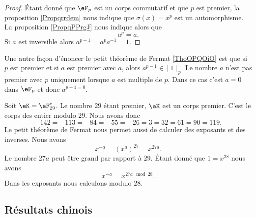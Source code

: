 \begin{proof}
    Étant donné que \( \eF_p\) est un corps commutatif et que \( p\) est premier, la proposition \ref{Propqrrdem} nous indique que \( \sigma(x)=x^p\) est un automorphisme. La proposition \ref{PropqPPrgJ} nous indique alors que
    \begin{equation}
        a^p=a.
    \end{equation}
    Si \( a\) est inversible alors \( a^{p-1}=a^pa^{-1}=1\).
\end{proof}

\begin{remark}      \label{RemCoSnxh}
    Une autre façon d'énoncer le petit théorème de Fermat \ref{ThoOPQOiO} est que si \( p\) est premier et si \( a\) est premier avec \( a\), alors \( a^{p-1}\in[1]_p\). Le nombre \( a\) n'est pas premier avec \( p\) uniquement lorsque \( a\) est multiple de \( p\). Dans ce cas c'est \( a=0\) dans \( \eF_p\) et donc \( a^{p-1=0}\).
\end{remark}

\begin{example}
    Soit \( \eK=\eF_{29}^*\). Le nombre \( 29\) étant premier, \( \eK\) est un corps premier. C'est le corps des entier modulo \( 29\). Nous avons donc
    \begin{equation}
            -142=-113=-84=-55=-26=3=32=61=90=119.
    \end{equation}
    Le petit théorème de Fermat nous permet aussi de calculer des exposants et des inverses. Nous avons
    \begin{equation}
        x^{-a}=(x^a)^{27}=x^{27a}.
    \end{equation}
    Le nombre \( 27 a\) peut être grand par rapport à \( 29\). Étant donné que \( 1=x^{28}\) nous avons
    \begin{equation}
        x^{-a}=x^{27 a\mod 28}.
    \end{equation}
    Dans les exposants nous calculons modulo \( 28\).
\end{example}

\subsection{Résultats chinois}

